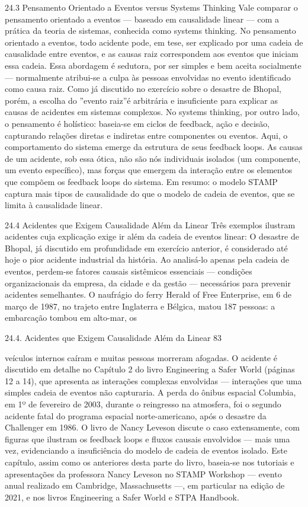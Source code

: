 24.3 Pensamento Orientado a Eventos versus Systems Thinking Vale comparar o pensamento orientado a eventos — baseado em causalidade linear — com a prática da teoria de sistemas, conhecida como systems thinking. No pensamento orientado a eventos, todo acidente pode, em tese, ser explicado por uma cadeia de causalidade entre eventos, e as causas raiz correspondem aos eventos que iniciam essa cadeia. Essa abordagem é sedutora, por ser simples e bem aceita socialmente — normalmente atribui-se a culpa às pessoas envolvidas no evento identificado como causa raiz. Como já discutido no exercício sobre o desastre de Bhopal, porém, a escolha do ”evento raiz”é arbitrária e insuficiente para explicar as causas de acidentes em sistemas complexos. No systems thinking, por outro lado, o pensamento é holístico: baseia-se em ciclos de feedback, ação e decisão, capturando relações diretas e indiretas entre componentes ou eventos. Aqui, o comportamento do sistema emerge da estrutura de seus feedback loops. As causas de um acidente, sob essa ótica, não são nós individuais isolados (um componente, um evento específico), mas forças que emergem da interação entre os elementos que compõem os feedback loops do sistema. Em resumo: o modelo STAMP captura mais tipos de causalidade do que o modelo de cadeia de eventos, que se limita à causalidade linear.

24.4 Acidentes que Exigem Causalidade Além da Linear Três exemplos ilustram acidentes cuja explicação exige ir além da cadeia de eventos linear: O desastre de Bhopal, já discutido em profundidade em exercício anterior, é considerado até hoje o pior acidente industrial da história. Ao analisá-lo apenas pela cadeia de eventos, perdem-se fatores causais sistêmicos essenciais — condições organizacionais da empresa, da cidade e da gestão — necessários para prevenir acidentes semelhantes. O naufrágio do ferry Herald of Free Enterprise, em 6 de março de 1987, no trajeto entre Inglaterra e Bélgica, matou 187 pessoas: a embarcação tombou em alto-mar, os

24.4. Acidentes que Exigem Causalidade Além da Linear 83

veículos internos caíram e muitas pessoas morreram afogadas. O acidente é discutido em detalhe no Capítulo 2 do livro Engineering a Safer World (páginas 12 a 14), que apresenta as interações complexas envolvidas — interações que uma simples cadeia de eventos não capturaria. A perda do ônibus espacial Columbia, em 1º de fevereiro de 2003, durante o reingresso na atmosfera, foi o segundo acidente fatal do programa espacial norte-americano, após o desastre da Challenger em 1986. O livro de Nancy Leveson discute o caso extensamente, com figuras que ilustram os feedback loops e fluxos causais envolvidos — mais uma vez, evidenciando a insuficiência do modelo de cadeia de eventos isolado. Este capítulo, assim como os anteriores desta parte do livro, baseia-se nos tutoriais e apresentações da professora Nancy Leveson no STAMP Workshop — evento anual realizado em Cambridge, Massachusetts —, em particular na edição de 2021, e nos livros Engineering a Safer World e STPA Handbook.

